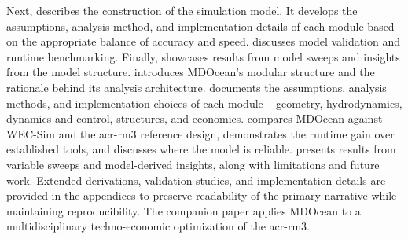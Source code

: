     Next,  describes the construction of the simulation model.
    It develops the assumptions, analysis method, and implementation details of each module based on the appropriate balance of accuracy and speed.
     discusses model validation and runtime benchmarking.
    Finally,  showcases results from model sweeps and insights from the model structure.
\else
     introduces MDOcean's modular structure and the rationale behind its analysis architecture.
     documents the assumptions, analysis methods, and implementation choices of each module -- geometry, hydrodynamics, dynamics and control, structures, and economics.
     compares MDOcean against WEC-Sim and the \gls{acr-rm3} reference design, demonstrates the runtime gain over established tools, and discusses where the model is reliable.
     presents results from variable sweeps and model-derived insights, along with limitations and future work.
    Extended derivations, validation studies, and implementation details are provided in the appendices to preserve readability of the primary narrative while maintaining reproducibility.
    The companion paper \citep{mccabe_leveraging_2026} applies MDOcean to a multidisciplinary techno-economic optimization of the \gls{acr-rm3}.
\fi